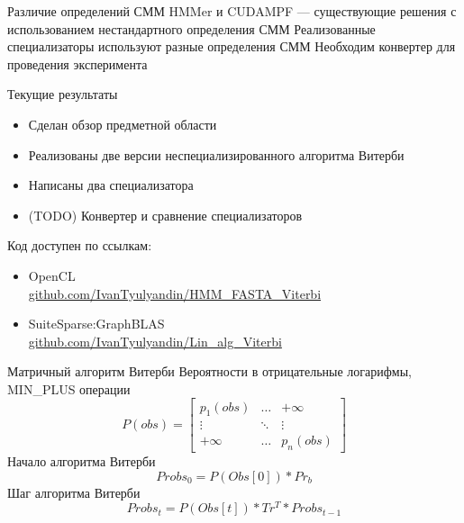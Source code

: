 \documentclass[hyperref={pdfpagelabels=false}]{beamer}
\begin{document}
\begin{frame}{Различие определений СММ}
	HMMer и CUDAMPF --- существующие решения
	с использованием нестандартного определения СММ
\vfill
	Реализованные специализаторы используют разные 
	определения СММ
\vfill
	Необходим конвертер для проведения эксперимента
\end{frame}


\begin{frame}{Текущие результаты}
\begin{itemize}
	\item Сделан обзор предметной области
	\item Реализованы две версии неспециализированного 
	алгоритма Витерби
	\item Написаны два специализатора
	\item (TODO) Конвертер и сравнение специализаторов
\end{itemize}
\vfill
Код доступен по ссылкам:
\begin{itemize}
	\item OpenCL\\
	\href{https://github.com/IvanTyulyandin/HMM_FASTA_Viterbi}{github.com/IvanTyulyandin/HMM\_FASTA\_Viterbi}
	\item SuiteSparse:GraphBLAS\\
	\href{https://github.com/IvanTyulyandin/Lin_alg_Viterbi}{github.com/IvanTyulyandin/Lin\_alg\_Viterbi}
\end{itemize}
\end{frame}

\begin{frame}{Матричный алгоритм Витерби}
	Вероятности в отрицательные логарифмы, MIN\_PLUS операции
\vfill
\[
  P(obs) =
  \begin{bmatrix}
    p_{1}(obs) & \hdots & +\infty \\
    \vdots & \ddots & \vdots\\
    +\infty & \hdots & p_{n}(obs)
  \end{bmatrix}
\]
\vfill
Начало алгоритма Витерби\\
\[Probs_{0} = P(Obs[0]) * Pr_b\]
\vfill
Шаг алгоритма Витерби\\
\[Probs_{t} = P(Obs[t]) * Tr^{T} * Probs_{t - 1}\]
\end{frame}
\end{document}
